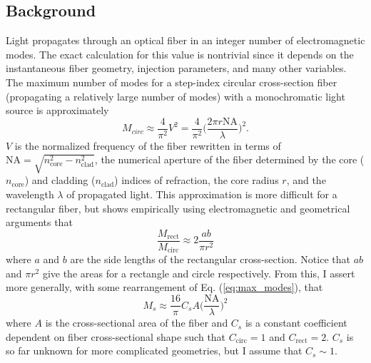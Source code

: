 \documentclass[11pt]{article}
\begin{document}
\subsection{Background}
\label{subsec:modal_noise_intro}

Light propagates through an optical fiber in an integer number of electromagnetic modes. The exact calculation for this value is nontrivial since it depends on the instantaneous fiber geometry, injection parameters, and many other variables. The maximum number of modes for a step-index circular cross-section fiber (propagating a relatively large number of modes) with a monochromatic light source is approximately
\begin{equation}
M_{circ} \approx \frac{4}{\pi ^2} V^2 = \frac{4}{\pi ^2} \Bigg( \frac{2 \pi r \mathrm{NA}}{\lambda} \Bigg) ^2.
\label{eq:max_modes}
\end{equation}
$V$ is the normalized frequency of the fiber rewritten in terms of $\mathrm{NA} = \sqrt{n_\mathrm{core}^2 - n_\mathrm{clad}^2}$, the numerical aperture of the fiber determined by the core ($n_\mathrm{core}$) and cladding ($n_\mathrm{clad}$) indices of refraction, the core radius $r$, and the wavelength $\lambda$ of propagated light. This approximation is more difficult for a rectangular fiber, but \citet{Nikitin2011} shows empirically using electromagnetic and geometrical arguments that
\begin{equation}
\frac{M_\mathrm{rect}}{M_\mathrm{circ}} \approx 2 \frac{ab}{\pi r^2}
\label{eq:prop_modes}
\end{equation}
where $a$ and $b$ are the side lengths of the rectangular cross-section. Notice that $ab$ and $\pi r^2$ give the areas for a rectangle and circle respectively. From this, I assert more generally, with some rearrangement of Eq. (\ref{eq:max_modes}), that
\begin{equation}
M_{s} \approx \frac{16}{\pi} C_{s} A \Bigg( \frac{\mathrm{NA}}{\lambda} \Bigg) ^2
\label{eq:mode_area}
\end{equation}
where $A$ is the cross-sectional area of the fiber and $C_{s}$ is a constant coefficient dependent on fiber cross-sectional shape such that $C_\mathrm{circ} = 1$ and $C_\mathrm{rect} = 2$. $C_{s}$ is so far unknown for more complicated geometries, but I assume that $C_{s} \sim 1$.
\end{document}
